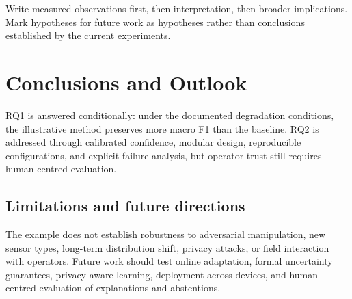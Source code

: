 \begin{keypoint}
Write measured observations first, then interpretation, then broader implications. Mark hypotheses for future work as hypotheses rather than conclusions established by the current experiments.
\end{keypoint}

\chapter{Conclusions and Outlook}
RQ1 is answered conditionally: under the documented degradation conditions, the illustrative method preserves more macro F1 than the baseline. RQ2 is addressed through calibrated confidence, modular design, reproducible configurations, and explicit failure analysis, but operator trust still requires human-centred evaluation.

\section{Limitations and future directions}
The example does not establish robustness to adversarial manipulation, new sensor types, long-term distribution shift, privacy attacks, or field interaction with operators. Future work should test online adaptation, formal uncertainty guarantees, privacy-aware learning, deployment across devices, and human-centred evaluation of explanations and abstentions.
